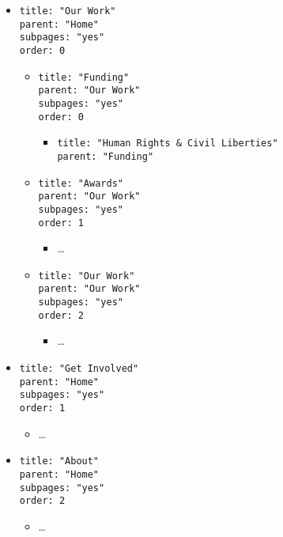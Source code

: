 \begin{itemize}
  \item \texttt{title: "Our Work"\\parent: "Home"\\subpages: "yes"\\order: 0}
  \begin{itemize}
    \item \texttt{title: "Funding"\\parent: "Our Work"\\subpages: "yes"\\order: 0}
    \begin{itemize}
      \item \texttt{title: "Human Rights \& Civil Liberties"\\parent: "Funding"}
    \end{itemize}
    \item \texttt{title: "Awards"\\parent: "Our Work"\\subpages: "yes"\\order: 1}
    \begin{itemize}
      \item \ldots{}
    \end{itemize}
    \item \texttt{title: "Our Work"\\parent: "Our Work"\\subpages: "yes"\\order: 2}
    \begin{itemize}
      \item \ldots{}
    \end{itemize}
  \end{itemize}
  \item \texttt{title: "Get Involved"\\parent: "Home"\\subpages: "yes"\\order: 1}
  \begin{itemize}
    \item \ldots{}
  \end{itemize}
  \item \texttt{title: "About"\\parent: "Home"\\subpages: "yes"\\order: 2}
  \begin{itemize}
    \item \ldots{}
  \end{itemize}
\end{itemize}

